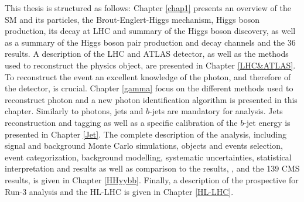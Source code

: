 This thesis is structured as follows: Chapter \ref{chap1} presents an overview of the SM and its particles, the Brout-Englert-Higgs mechanism, Higgs boson production, its decay at LHC and summary of the Higgs boson discovery, as well as a summary of the Higgs boson pair production and decay channels and the 36 \ifb results. A description of the LHC and ATLAS detector, as well as the methods used to reconstruct the physics object, are presented in Chapter \ref{LHC&ATLAS}. To reconstruct the \HHyybb event an excellent knowledge of the photon, and therefore of the detector, is crucial. Chapter \ref{gamma} focus on the different methods used to reconstruct photon and a new photon identification algorithm is presented in this chapter. Similarly to photons, jets and $b$-jets are mandatory for \HHyybb analysis. Jets reconstruction and tagging as well as a specific calibration of the $b$-jet energy is presented in Chapter \ref{Jet}. The complete description of the \HHyybb analysis, including signal and background Monte Carlo simulations, objects and events selection, event categorization, background modelling, systematic uncertainties, statistical interpretation and results as well as comparison to the  \ifb results, \bbbb, \bbtt and the 139 \ifb CMS \HHyybb results, is given in Chapter \ref{HHyybb}. Finally, a description of the prospective for Run-3 analysis and the HL-LHC is given in Chapter \ref{HL-LHC}. 
